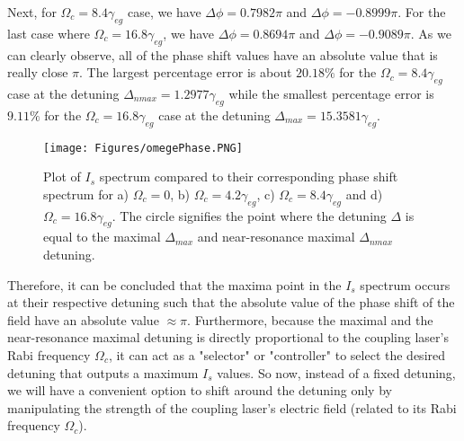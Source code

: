 Next,  for $\Omega_{c} = 8.4\gamma_{eg}$ case, we have $\Delta\phi = 0.7982\pi$ and $\Delta\phi = -0.8999\pi$. For the last case where $\Omega_{c} = 16.8\gamma_{eg}$, we have $\Delta\phi = 0.8694\pi$ and $\Delta\phi = -0.9089\pi$. As we can clearly observe, all of the phase shift values have an absolute value that is really close $\pi$. The largest percentage error is about $20.18\%$ for the $\Omega_{c} = 8.4\gamma_{eg}$ case at the detuning $\Delta_{nmax} = 1.2977\gamma_{eg}$ while the smallest percentage error is $9.11\%$ for the $\Omega_{c} = 16.8\gamma_{eg}$ case at the detuning $\Delta_{max} = 15.3581\gamma_{eg}$.

\newpage

\begin{figure}[h!]
    \centering
    \texttt{[image: Figures/omegePhase.PNG]}
    \caption{Plot of $I_{s}$ spectrum compared to their corresponding phase shift spectrum for a) $\Omega_{c} = 0$, b) $\Omega_{c} = 4.2\gamma_{eg}$, c) $\Omega_{c} = 8.4\gamma_{eg}$ and d) $\Omega_{c} = 16.8\gamma_{eg}$. The circle signifies the point where the detuning $\Delta$ is equal to the maximal $\Delta_{max}$ and near-resonance maximal $\Delta_{nmax}$ detuning.}
    \label{fig: omegaPhase}
\end{figure}

Therefore, it can be concluded that the maxima point in the $I_{s}$ spectrum occurs at their respective detuning such that the absolute value of the phase shift of the field have an absolute value $\approx \pi$. Furthermore, because the maximal and the near-resonance maximal detuning is directly proportional to the coupling laser's Rabi frequency $\Omega_{c}$, it can act as a "selector" or "controller" to select the desired detuning that outputs a maximum $I_{s}$ values. So now, instead of a fixed detuning, we will have a convenient option to shift around the detuning only by manipulating the strength of the coupling laser's electric field (related to its Rabi frequency $\Omega_{c}$).
